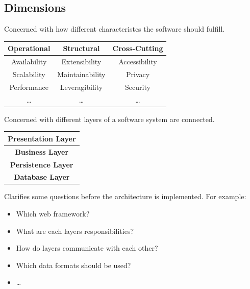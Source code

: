 \documentclass[
../../Software_Engineering_Summary.tex,
]
{subfiles}
\begin{document}
\subsection{Dimensions}
\begin{defbox}
    Concerned with how different characteristcs the software should fulfill.
    \begin{center}
        \begin{tabular}{|c|c|c|}
            \hline
            \rowcolor{codered!40}\textbf{Operational} & \textbf{Structural} & \textbf{Cross-Cutting}\\
            \hline
            Availability & Extensibility & Accessibility\\
            Scalability & Maintainability & Privacy\\
            Performance & Leveragibility & Security\\
            \dots & \dots & \dots\\
            \hline
        \end{tabular}
    \end{center}
\end{defbox}

\begin{defbox}
    Concerned with different layers of a software system are connected.

    \begin{center}
        \begin{tabular}{|c|}
            \hline
            \rowcolor{codered!40!white}\textbf{Presentation Layer}\\
            \hline
            \rowcolor{codeblue!40!white}\textbf{Business Layer}\\
            \hline
            \rowcolor{codegreen!40!white}\textbf{Persistence Layer}\\
            \hline
            \rowcolor{yellow!40!white}\textbf{Database Layer}\\
            \hline
        \end{tabular}
    \end{center}
\end{defbox}

\begin{defbox}
    Clarifies some questions before the architecture is implemented. For example:
    \begin{itemize}
        \item Which web framework?
        \item What are each layers responsibilities?
        \item How do layers communicate with each other?
        \item Which data formats should be used?
        \item \dots
    \end{itemize}
\end{defbox}
\end{document}
